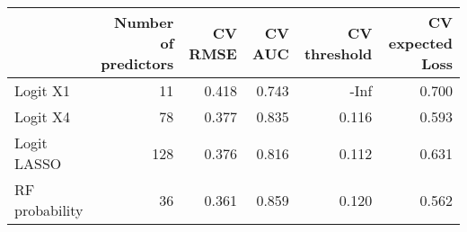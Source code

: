 
\begin{tabular}{lrrrrr}
\toprule
  & Number of predictors & CV RMSE & CV AUC & CV threshold & CV expected Loss\\
\midrule
Logit X1 & 11 & 0.418 & 0.743 & -Inf & 0.700\\
Logit X4 & 78 & 0.377 & 0.835 & 0.116 & 0.593\\
Logit LASSO & 128 & 0.376 & 0.816 & 0.112 & 0.631\\
RF probability & 36 & 0.361 & 0.859 & 0.120 & 0.562\\
\bottomrule
\end{tabular}